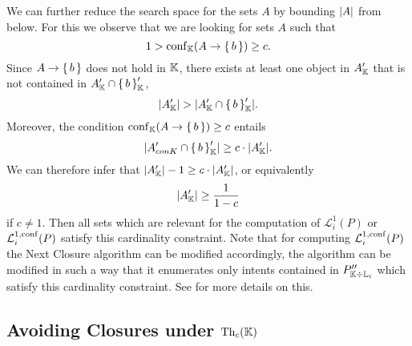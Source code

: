 We can further reduce the search space for the sets $A$ by bounding $\lvert A\rvert$ from below.
For this we observe that we are looking for sets $A$ such that
\begin{equation*}
  1 > \operatorname{conf}_{{\mathbb{K}}}(A \to {\ensuremath{\{\,b\,\}}}) \ge c.
\end{equation*}
Since $A \to {\ensuremath{\{\,b\,\}}}$ does not hold in ${\mathbb{K}}$, there exists at least one object in
$A_{{\mathbb{K}}}'$ that is not contained in $A_{{\mathbb{K}}}' \cap {\ensuremath{\{\,b\,\}}}_{{\mathbb{K}}}'$, \ie
\begin{equation*}
  \lvert A_{{\mathbb{K}}}' \rvert > \lvert A_{{\mathbb{K}}}' \cap {\ensuremath{\{\, b \,\}}}_{{\mathbb{K}}}' \rvert.
\end{equation*}
Moreover, the condition $\operatorname{conf}_{{\mathbb{K}}}(A \to {\ensuremath{\{\,b\,\}}}) \ge c$ entails
\begin{equation*}
  \lvert A_{con K}' \cap {\ensuremath{\{\,b\,\}}}_{{\mathbb{K}}}' \rvert \ge c \cdot \lvert A_{{\mathbb{K}}}'\rvert.
\end{equation*}
We can therefore infer that $\lvert A_{{\mathbb{K}}}'\rvert - 1 \geq c \cdot \lvert A_{{\mathbb{K}}}'\rvert$, or
equivalently
\begin{equation*}
  \lvert A_{{\mathbb{K}}}'\rvert \geq \frac{1}{1 - c}
\end{equation*}
if $c \neq 1$.  Then all sets which are relevant for the computation of
$\mathcal{L}_{i}^{1}(P)$ or $\mathcal{L}_{i}^{1,\operatorname{conf}}(P)$ satisfy this cardinality
constraint.  Note that for computing $\mathcal{L}_{i}^{1,\operatorname{conf}}(P)$ the Next Closure
algorithm can be modified accordingly, \ie the algorithm can be modified in such a way
that it enumerates only intents contained in $P_{{\mathbb{K}} \div {\ensuremath{\mathbb{L}}}_{i}}''$ which satisfy
this cardinality constraint.  See \cite[Theorem~51]{fca-book} for more details on this.

\subsection{Avoiding Closures under $\operatorname{Th}_{c}({\mathbb{K}})$}
\label{sec:poss-fast-expl}

%


